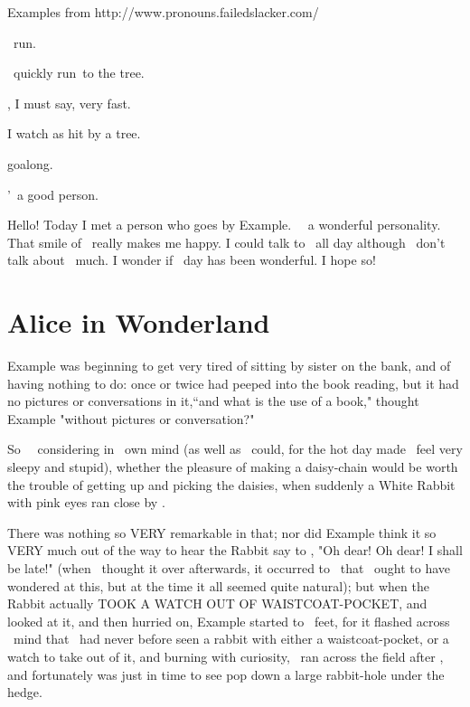 \documentclass{article}
\begin{document}
Examples from http://www.pronouns.failedslacker.com/

\set

\They\ run\s.

\They\ quickly run\s\  to the tree.

\They[2] \were[2], I must say, very fast.

I watch as \they[2] \are[2] hit by a tree.

\They[3] go\es[3] along.

\They[4]'\re\ a good person.

Hello! Today I met a person who goes by Example. \They\ \have\ a wonderful personality. That smile of \theirs\ really makes me happy. I could talk to \them\ all day although \they\ do\es n't talk about \themself\ much. I wonder if \their\ day has been wonderful. I hope so!

\section{Alice in Wonderland}

\set
 Example  was beginning to get very tired of sitting by \their[1] sister on the bank, and of having nothing to do: once or twice \they[1] had peeped into the book \they[2] \were[2] reading, but it had no pictures or conversations in it,``and what is the use of a book," thought  Example  "without pictures or conversation?"

\set
So \they\ \were\ considering in \their\ own mind (as well as \they\ could, for the hot day made \them\ feel very sleepy and stupid), whether the pleasure of making a daisy-chain would be worth the trouble of getting up and picking the daisies, when suddenly a White Rabbit with pink eyes ran close by \them.

\set
There was nothing so VERY remarkable in that; nor did  Example  think it so VERY much out of the way to hear the Rabbit say to \themself[2], "Oh dear! Oh dear! I shall be late!" (when \they\ thought it over afterwards, it occurred to \them\ that \they\ ought to have wondered at this, but at the time it all seemed quite natural); but when the Rabbit actually TOOK A WATCH OUT OF \their[2] WAISTCOAT-POCKET, and looked at it, and then hurried on,  Example  started to \their\ feet, for it flashed across \their\ mind that \they\ had never before seen a rabbit with either a waistcoat-pocket, or a watch to take out of it, and burning with curiosity, \they\ ran across the field after \them[2], and fortunately was just in time to see \them[2] pop down a large rabbit-hole under the hedge.
\end{document}
